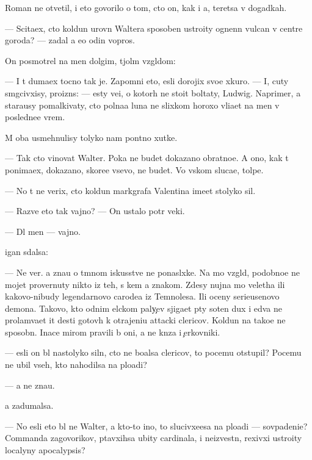 \documentclass[10pt]{book}
\begin{document}
Roman ne otvetil, i eto govorilo o tom, cto on, kak i {\y}a, ter{\ia}{\y}etsa v dogadkah.

— Scita{\y}ex, cto koldun urovn{\ia} Waltera sposoben ustro{\y}ity ognenn{\yi}{\y} vulcan v centre goroda? — zadal {\y}a {\y}e{\x}o odin vopros.

On posmotrel na men{\ia} dolgim, t{\ia}jol{\yi}m vzgl{\ia}dom:

— I t{\yi} duma{\y}ex tocno tak je. Zapomni eto, {\y}esli dorojix svo{\y}e{\y} xkuro{\y}. — I, cuty sm{\ia}gcivxisy, proizn{\e}s: — {\Y}esty ve{\x}i, o kotor{\yi}h ne stoit boltaty, Ludwig. Naprimer, {\y}a stara{\y}usy pomalkivaty, cto polna{\y}a luna ne slixkom horoxo vli{\y}a{\y}et na men{\ia} v posledne{\y}e vrem{\ia}.

M{\yi} oba usmehnulisy tolyko nam pon{\ia}tno{\y} xutke.

— Tak cto vinovat Walter. Poka ne budet dokazano obratno{\y}e. A ono, kak t{\yi} ponima{\y}ex, dokazano, skore{\y}e vsevo, ne budet. Vo vs{\ia}kom sluca{\y}e, tolpe.

— No t{\yi} ne verix, cto koldun markgrafa Valentina ime{\y}et stolyko sil.

— Razve eto tak vajno? — On ustalo pot{\e}r veki.

— Dl{\ia} men{\ia} — vajno.

{\C}igan sdalsa:

— Ne ver{\io}. {\Y}a zna{\y}u o t{\e}mnom iskusstve ne ponasl{\yi}xke. Na mo{\y} vzgl{\ia}d, podobno{\y}e ne mojet provernuty nikto iz teh, s kem {\y}a znakom. Zdesy nujna mo{\x} veletha ili kakovo-nibudy legendarnovo carode{\y}a iz Temnoles{\y}a. Ili oceny serieusenovo demona. Takovo, kto odnim {\x}elckom paly{\c}ev sjiga{\y}et p{\ia}ty soten dux i {\y}edva ne prolam{\yi}va{\y}et {\x}it des{\ia}ti gotov{\yi}h k otrajeni{\y}u attacki clericov. Koldun{\yi} na tako{\y}e ne sposobn{\yi}. Inace mirom pravili b{\yi} oni, a ne kn{\ia}z{\y}a i {\c}erkovniki.

— {\Y}esli on b{\yi}l nastolyko sil{\e}n, cto ne bo{\y}alsa clericov, to pocemu otstupil? Pocemu ne ubil vseh, kto nahodilsa na plo{\x}adi?

— {\Y}a ne zna{\y}u.

{\Y}a zadumalsa.

— No {\y}esli eto b{\yi}l ne Walter, a kto-to ino{\y}, to slucivxe{\y}esa na plo{\x}adi — sovpadeni{\y}e? Commanda zagovor{\x}ikov, p{\yi}tavxihsa ubity cardinala, i neizvestn{\yi}{\y}, rexivxi{\y} ustro{\y}ity localyn{\yi}y apocalypsis?
\end{document}
